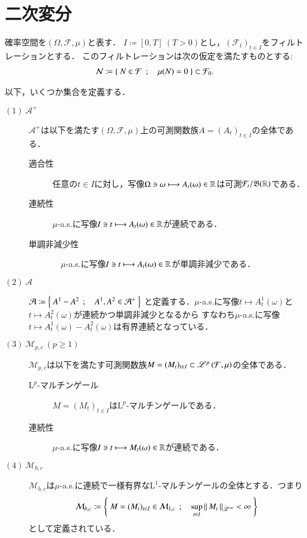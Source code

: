 \section{二次変分}
	確率空間を$(\Omega,\mathcal{F},\mu)$と表す．
	$I \coloneqq [0,T]\ (T>0)$とし，$(\mathcal{F}_t)_{t \in I}$をフィルトレーションとする．
	このフィルトレーションは次の仮定を満たすものとする:
	\begin{align}
		\mathcal{N} \coloneqq \left\{\ N \in \mathcal{F}\ \, ; \quad \mu(N) = 0\ \right\}
		\subset \mathcal{F}_0.
	\end{align}
	
	以下，いくつか集合を定義する．
	\begin{description}
		\item[$\mathrm{(1)}\ \mathcal{A}^+$] 
			$\mathcal{A}^+$は以下を満たす$(\Omega,\mathcal{F},\mu)$上の可測関数族$A = (A_t)_{t \in I}$の全体である．
			\begin{description}
				\item[適合性] 任意の$t \in I$に対し，写像$\Omega \ni \omega \longmapsto A_t(\omega) \in \mathbb{R}$は可測$\mathcal{F}_t/\mathfrak{B}(\mathbb{R})$である．
				\item[連続性] $\mu$-a.s.に写像$I \ni t \longmapsto A_t(\omega) \in \mathbb{R}$が連続である．
				\item[単調非減少性]　$\mu$-a.s.に写像$I \ni t \longmapsto A_t(\omega) \in \mathbb{R}$が単調非減少である．
			\end{description}
		
		\item[$\mathrm{(2)}\ \mathcal{A}$]
			$\mathcal{A} \coloneqq \left\{\ A^1 - A^2\ \, ; \quad A^1,A^2 \in \mathcal{A}^+\ \right\}$
			と定義する．$\mu$-a.s.に写像$t \longmapsto A^1_t(\omega)$と$t \longmapsto A^2_t(\omega)$が連続かつ単調非減少となるから
			すなわち$\mu$-a.s.に写像$t \longmapsto A^1_t(\omega) - A^2_t(\omega)$は有界連続となっている．
			
		\item[$\mathrm{(3)}\ \mathcal{M}_{p,c}\ (p \geq 1)$]
			$\mathcal{M}_{p,c}$は以下を満たす可測関数族$M = (M_t)_{t \in I} \subset \mathscr{L}^{p} \left(\mathcal{F},\mu\right)$の全体である．
			\begin{description}
				\item[$\mathrm{L}^p$-マルチンゲール] $M = (M_t)_{t \in I}$は$\mathrm{L}^p$-マルチンゲールである．
				\item[連続性] $\mu$-a.s.に写像$I \ni t \longmapsto M_t(\omega) \in \mathbb{R}$が連続である．
			\end{description}
		
		\item[$\mathrm{(4)}\ \mathcal{M}_{b,c}$]
			$\mathcal{M}_{b,c}$は$\mu$-a.s.に連続で一様有界な$\mathrm{L}^1$-マルチンゲールの全体とする．つまり
			\begin{align}
				\mathcal{M}_{b,c} \coloneqq \left\{\ M = (M_t)_{t \in I} \in \mathcal{M}_{1,c}\ \, ; \quad \operatorname*{sup}_{t \in I} \left\|\, M_t\, \right\|_{\mathscr{L}^\infty} < \infty\ \right\}
			\end{align}
			として定義されている．
			

\end{description}
